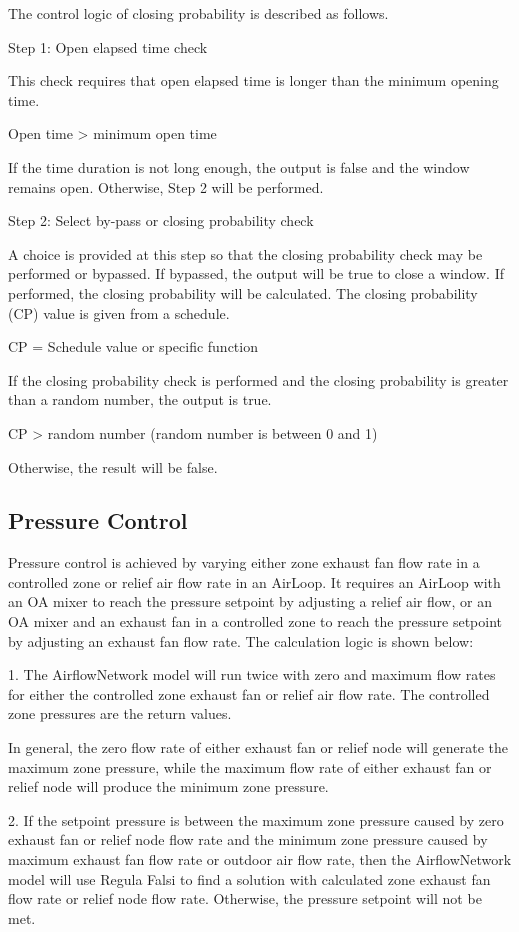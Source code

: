 The control logic of closing probability is described as follows.

Step 1: Open elapsed time check

This check requires that open elapsed time is longer than the minimum opening time.

Open time \textgreater{} minimum open time

If the time duration is not long enough, the output is false and the window remains open. Otherwise, Step 2 will be performed.

Step 2: Select by-pass or closing probability check

A choice is provided at this step so that the closing probability check may be performed or bypassed. If bypassed, the output will be true to close a window. If performed, the closing probability will be calculated. The closing probability (CP) value is given from a schedule.

CP = Schedule value or specific function

If the closing probability check is performed and the closing probability is greater than a random number, the output is true.

CP \textgreater{} random number (random number is between 0 and 1)

Otherwise, the result will be false.

\subsection{Pressure Control}\label{pressure-control}

Pressure control is achieved by varying either zone exhaust fan flow rate in a controlled zone or relief air flow rate in an AirLoop. It requires an AirLoop with an OA mixer to reach the pressure setpoint by adjusting a relief air flow, or an OA mixer and an exhaust fan in a controlled zone to reach the pressure setpoint by adjusting an exhaust fan flow rate. The calculation logic is shown below:

1. The AirflowNetwork model will run twice with zero and maximum flow rates for either the controlled zone exhaust fan or relief air flow rate. The controlled zone pressures are the return values.

	In general, the zero flow rate of either exhaust fan or relief node will generate the maximum zone pressure, while the maximum flow rate of either exhaust fan or relief node will produce the minimum zone pressure. 

2. If the setpoint pressure is between the maximum zone pressure caused by zero exhaust fan or relief node flow rate and the minimum zone pressure caused by maximum exhaust fan flow rate or outdoor air flow rate, then the AirflowNetwork model will use Regula Falsi to find a solution with calculated zone exhaust fan flow rate or relief node flow rate. Otherwise, the pressure setpoint will not be met. 


